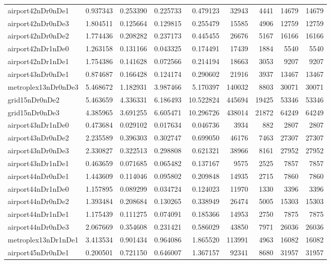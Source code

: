 \begin{longtable}{|l|r|r|r|r|r|r|r|r|}
airport42nDr0nDe1 & 0.937343 & 0.253390 & 0.225733 & 0.479123 & 32943 & 4441 & 14679 & 14679 \\
airport42nDr0nDe3 & 1.804511 & 0.125664 & 0.129815 & 0.255479 & 15585 & 4906 & 12759 & 12759 \\
airport42nDr0nDe2 & 1.774436 & 0.208282 & 0.237173 & 0.445455 & 26676 & 5167 & 16166 & 16166 \\
airport42nDr1nDe0 & 1.263158 & 0.131166 & 0.043325 & 0.174491 & 17439 & 1884 & 5540 & 5540 \\
airport42nDr1nDe1 & 1.754386 & 0.141628 & 0.072566 & 0.214194 & 18663 & 3053 & 9207 & 9207 \\
airport43nDr0nDe1 & 0.874687 & 0.166428 & 0.124174 & 0.290602 & 21916 & 3937 & 13467 & 13467 \\
metroplex13nDr0nDe3 & 5.468672 & 1.182931 & 3.987466 & 5.170397 & 140032 & 8803 & 30071 & 30071 \\
grid15nDr0nDe2 & 5.463659 & 4.336331 & 6.186493 & 10.522824 & 445694 & 19425 & 53346 & 53346 \\
grid15nDr0nDe3 & 4.385965 & 3.691255 & 6.605471 & 10.296726 & 438014 & 21872 & 64249 & 64249 \\
airport43nDr1nDe0 & 0.473684 & 0.029102 & 0.017634 & 0.046736 & 3934 & 882 & 2807 & 2807 \\
airport43nDr0nDe2 & 2.235589 & 0.396303 & 0.302747 & 0.699050 & 46176 & 7463 & 27307 & 27307 \\
airport43nDr0nDe3 & 2.330827 & 0.322513 & 0.298808 & 0.621321 & 38966 & 8161 & 27952 & 27952 \\
airport43nDr1nDe1 & 0.463659 & 0.071685 & 0.065482 & 0.137167 & 9575 & 2525 & 7857 & 7857 \\
airport44nDr0nDe1 & 1.443609 & 0.114046 & 0.095802 & 0.209848 & 14935 & 2715 & 7860 & 7860 \\
airport44nDr1nDe0 & 1.157895 & 0.089299 & 0.034724 & 0.124023 & 11970 & 1330 & 3396 & 3396 \\
airport44nDr0nDe2 & 1.393484 & 0.208684 & 0.130265 & 0.338949 & 26474 & 5005 & 15303 & 15303 \\
airport44nDr1nDe1 & 1.175439 & 0.111275 & 0.074091 & 0.185366 & 14953 & 2750 & 7875 & 7875 \\
airport44nDr0nDe3 & 2.067669 & 0.354608 & 0.231421 & 0.586029 & 43850 & 7971 & 26036 & 26036 \\
metroplex13nDr1nDe1 & 3.413534 & 0.901434 & 0.964086 & 1.865520 & 113991 & 4963 & 16082 & 16082 \\
airport45nDr0nDe1 & 0.200501 & 0.721150 & 0.646007 & 1.367157 & 92341 & 8680 & 31957 & 31957 \\

\end{longtable}
